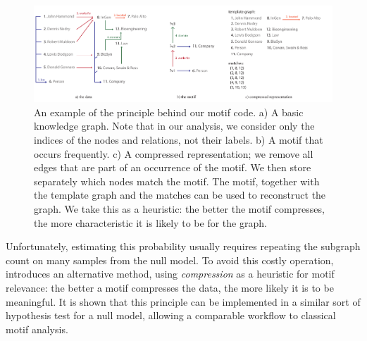 \documentclass[letterpaper]{article} %
\begin{document}
\begin{figure}[bth]
  \centering
    \includegraphics[width=\textwidth]{example.pdf}
    \caption{An example of the principle behind our motif code. a) A basic knowledge graph. Note that in our analysis, we consider only the indices of the nodes and relations, not their labels. b) A motif that occurs frequently. c) A compressed representation; we remove all edges that are part of an occurrence of the motif. We then store separately which nodes match the motif. The motif, together with the template graph and the matches can be used to reconstruct the graph. We take this as a heuristic: the better the motif compresses, the more characteristic it is likely to be for the graph.}
    \label{figure:example}
  \label{figure:codes}
\end{figure}

Unfortunately, estimating this probability usually requires repeating the subgraph count on many samples from the null model. To avoid this costly operation, \cite{bloem2017large} introduces  an alternative method, using \emph{compression} as a heuristic for motif relevance: the better a motif compresses the data, the more likely it is to be meaningful. It is shown that this principle can be implemented in a similar sort of hypothesis test for a null model, allowing a comparable workflow to classical motif analysis. 

\end{document}
